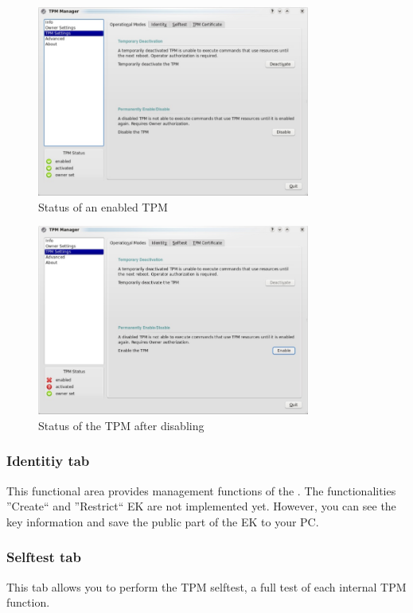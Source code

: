 \documentclass[
  american        %
]{sirrixreport}
\begin{document}
\begin{figure}[h]
 \centering
   \includegraphics[width=0.8\textwidth]{images/man_statenabled}
   \caption{Status of an enabled TPM}
\label{fig:disable}
\end{figure}
\begin{figure}[h]
 \centering
   \includegraphics[width=0.8\textwidth]{images/man_statdisabled}
   \caption{Status of the TPM after disabling}
\label{fig:enable}
\end{figure}
\clearpage

\subsubsection{Identitiy tab} This functional area provides management functions of the \EK. The functionalities ''Create`` and ''Restrict`` EK are not implemented yet. However, you can see the key information and save the public part of the EK to your PC. 
\subsubsection{Selftest tab} This tab allows you to perform the TPM selftest, a full test of each internal TPM function.
\end{document}
